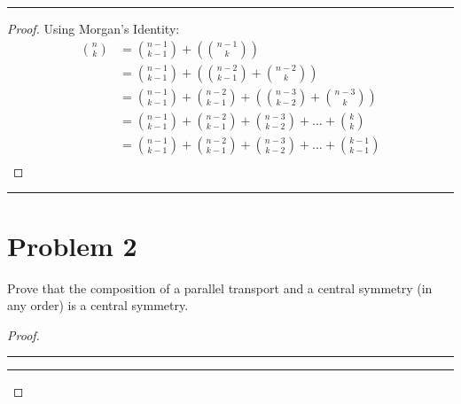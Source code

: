 \documentclass[openany, amssymb, psamsfonts]{amsart}
\theoremstyle{definition}
\numberwithin{equation}{section}
\begin{document}
\vspace{4pt}     \hrule   \vspace{4pt}\begin{proof}Using Morgan's Identity:
\begin{align*}
 \binom{n}{k} &= \binom{n-1}{k-1}+(\binom{n-1}{k})\\
    &= \binom{n-1}{k-1}+(\binom{n-2}{k-1} + \binom{n-2}{k})\\
    &= \binom{n-1}{k-1}+\binom{n-2}{k-1} + (\binom{n-3}{k-2} + \binom{n-3}{k})\\
    &= \binom{n-1}{k-1}+\binom{n-2}{k-1} + \binom{n-3}{k-2} + \dots + \binom{k}{k}\\
    &= \binom{n-1}{k-1}+\binom{n-2}{k-1} + \binom{n-3}{k-2} + \dots + \binom{k-1}{k-1}\\
\end{align*}
    
\end{proof}\vspace{4pt}     \hrule   \vspace{4pt}
\section*{Problem 2}
Prove that the composition of a parallel transport and a central symmetry (in any order) is a central symmetry.
\begin{proof}\vspace{4pt}     \hrule   \vspace{4pt}
    
\vspace{4pt}     \hrule   \vspace{4pt}\end{proof}
\end{document}
